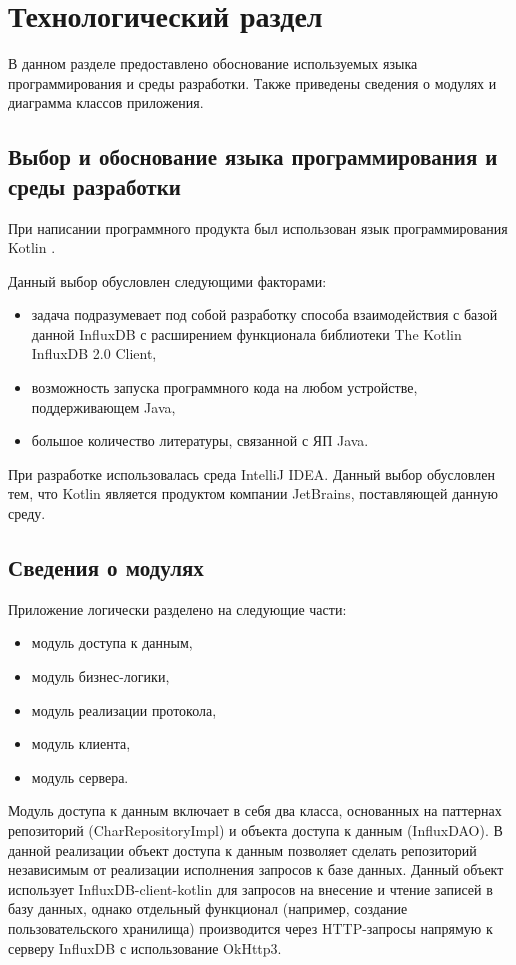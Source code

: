 \section{Технологический раздел}
В данном разделе предоставлено обоснование используемых языка программирования и среды разработки. Также приведены сведения о модулях и диаграмма классов приложения.

\subsection{Выбор и обоснование языка программирования и среды разработки}

При написании программного продукта был использован язык программирования Kotlin \cite{Kotlin}. 

Данный выбор обусловлен следующими факторами:
\begin{itemize}
\item задача подразумевает под собой разработку способа взаимодействия с базой данной InfluxDB с расширением функционала библиотеки The Kotlin InfluxDB 2.0 Client,
\item возможность запуска программного кода на любом устройстве, поддерживающем Java,
\item большое количество литературы, связанной с ЯП Java.
\end{itemize}

При разработке использовалась среда IntelliJ IDEA. Данный выбор обусловлен тем, что Kotlin является продуктом компании JetBrains, поставляющей данную среду.

\subsection{Сведения о модулях}
Приложение логически разделено на следующие части:
\begin{itemize}
\item модуль доступа к данным,
\item модуль бизнес-логики,
\item модуль реализации протокола,
\item модуль клиента,
\item модуль сервера.
\end{itemize}

Модуль доступа к данным включает в себя два класса, основанных на паттернах репозиторий (CharRepositoryImpl) и объекта доступа к данным (InfluxDAO). В данной реализации объект доступа к данным позволяет сделать репозиторий независимым от реализации исполнения запросов к базе данных. Данный объект использует InfluxDB-client-kotlin для запросов на внесение и чтение записей в базу данных, однако отдельный функционал (например, создание пользовательского хранилища) производится через HTTP-запросы напрямую к серверу InfluxDB с использование OkHttp3.

